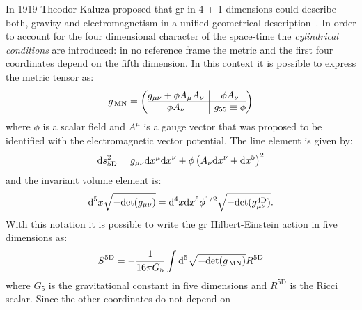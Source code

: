 In 1919 Theodor Kaluza proposed that \gls{gr} in 4 + 1 dimensions could describe
both, gravity and electromagnetism in a unified geometrical
description~\cite{Kaluza}. In order to account for the four dimensional
character of the space-time the \emph{cylindrical conditions} are introduced:
in no reference frame the metric and the first four coordinates depend on the
fifth dimension. In this context it is possible to express the metric tensor as:
\begin{equation}
  \label{eq:56}
  g_{\mathrm{\, MN}} =
  \left(
    \begin{array}{@{}c|c@{}}
      g_{\mu\nu} + \phi A_\mu A_\nu & \phi A_\nu \\
      \hline
      \phi A_\nu & g_{55} \equiv \phi
    \end{array}
  \right)
\end{equation}
where $\phi$ is a scalar field and $A^\mu$ is a gauge vector that was proposed
to be identified with the electromagnetic vector potential. The line element is
given by:
\begin{equation}
  \label{eq:57}
  \mathrm{d} s^2_{5 \mathrm{D}} = g_{\mu\nu} \mathrm{d} x^\mu \mathrm{d} x^\nu + \phi \left( A_\nu
    \mathrm{d} x^\nu + \mathrm{d} x^5 \right)^2
\end{equation}
and the invariant volume element is:
\begin{equation}
  \label{eq:58}
  \mathrm{d}^5 x \sqrt{- \mathrm{det}(g_{\mu\nu})} = \mathrm{d}^4 x \mathrm{d} x^5 \phi^{1/2} \sqrt{-
  \mathrm{det}(g_{\mu\nu}^{4 \mathrm{D}})}.
\end{equation}
With this notation it is possible to write the \gls{gr} Hilbert-Einstein action
in five dimensions as:
\begin{equation}
  \label{eq:59}
  S^{5 \mathrm{D}} = - \frac{1}{16 \pi G_5} \int \mathrm{d}^5 \sqrt{-
    \mathrm{det}(g_{\mathrm{\, MN}})} R^{5 \mathrm{D}}
\end{equation}
where $G_5$ is the gravitational constant in five dimensions and $R^{5
  \mathrm{D}}$ is the Ricci scalar. Since the other coordinates do not depend on
